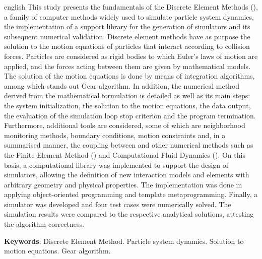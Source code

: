 \begin{resumo}[Abstract]
 \begin{otherlanguage*}{english}
   This study presents the fundamentals of the Discrete Element Methods (\DEM{}), a family of computer methods widely used to simulate particle system dynamics, the implementation of a support library for the generation of simulators and its subsequent numerical validation. Discrete element methods have as purpose the solution to the motion equations of particles that interact according to collision forces. Particles are considered as rigid bodies to which Euler's laws of motion are applied, and the forces acting between them are given by mathematical models. The solution of the motion equations is done by means of integration algorithms, among which stands out Gear algorithm. In addition, the numerical method derived from the mathematical formulation is detailed as well as its main steps: the system initialization, the solution to the motion equations, the data output, the evaluation of the simulation loop stop criterion and the program termination. Furthermore, additional tools are considered, some of which are neighborhood monitoring methods, boundary conditions, motion constraints and, in a summarised manner, the coupling between \DEM{} and other numerical methods such as the Finite Element Method (\FEM{}) and Computational Fluid Dynamics (\CFD{}). On this basis, a computational library was implemented to support the design of \DEM{} simulators, allowing the definition of new interaction models and elements with arbitrary geometry and physical properties. The implementation was done in \CPP{} applying object-oriented programming and template metaprogramming. Finally, a simulator was developed and four test cases were numerically solved. The simulation results were compared to the respective analytical solutions, attesting the algorithm correctness.

   \vspace{\onelineskip}
 
   \noindent 
   \textbf{Keywords}: Discrete Element Method. Particle system dynamics. Solution to motion equations. Gear algorithm.
 \end{otherlanguage*}
\end{resumo}

%

